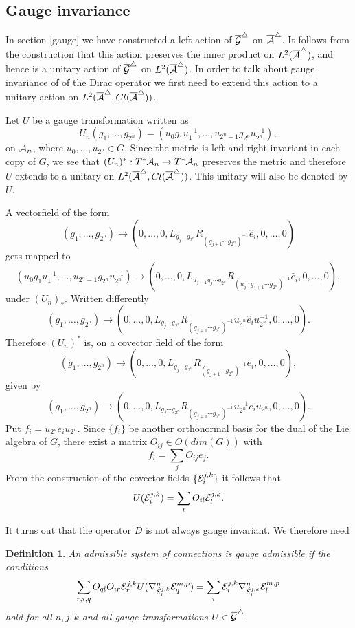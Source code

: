 \documentclass[12pt]{article}
\def\ca{{\cal A}}
\def\ce{{\cal E}}
\def\cf{{\cal F}}
\def\cg{{\cal G}}
\newtheorem{definition}[thm]{Definition}
\begin{document}
{\subsection{Gauge invariance}
In section \ref{gauge} we have constructed a left action of $\overline{\cg}^\triangle$ on $\overline{\ca}^\triangle$. It follows from the construction that this action preserves the inner product on $L^2(\overline{\ca}^\triangle)$, and hence is a unitary action of $\overline{\cg}^\triangle$ on $L^2(\overline{\ca}^\triangle)$. In order to talk about gauge invariance of of the Dirac operator we first need to extend this action to a unitary action on $L^2(\overline{\ca}^\triangle, Cl(\overline{\ca}^\triangle))$. 

Let $U$ be a gauge transformation written as 
$$U_n (g_1,\ldots, g_{2^n})=(u_0g_1u_1^{-1},\ldots , u_{2^n-1}g_{2^n}u_{2^n}^{-1}),$$
on $\ca_n$, where $u_0,\ldots , u_{2^n}\in G$. Since the metric is left and right invariant in each copy of $G$, we see that $(U_n)^*:T^*\ca_n\to T^*\ca_n$ preserves the metric and therefore $U$ extends to a unitary on $L^2(\overline{\ca}^\triangle, Cl(\overline{\ca}^\triangle))$. This unitary will also be denoted by $U$. 

A vectorfield of the form 
$$(g_1,\ldots, g_{2^n})\to (0,\ldots,0,L_{g_j\cdots g_{2^n}}R_{(g_{j+1}\cdots g_{2^n})^{-1}}\hat{e}_i,0 , \ldots,0)$$
gets mapped to
$$  (u_0g_1u_1^{-1},\ldots , u_{2^n-1}g_{2^n}u_{2^n}^{-1}) \to (0,\ldots,0,L_{u_{j-1}g_j\cdots g_{2^n}}R_{(u_{j}^{-1}g_{j+1}\cdots g_{2^n})^{-1}}\hat{e}_i,0 , \ldots,0),$$
under $(U_n)_*$. Written differently
$$(g_1,\ldots, g_{2^n})\to (0,\ldots,0,L_{g_j\cdots g_{2^n}}R_{(g_{j+1}\cdots g_{2^n})^{-1}}u_{2^n}\hat{e}_iu_{2^n}^{-1},0 , \ldots,0).$$
Therefore $(U_n)^*$ is, on a covector field of the form 
$$(g_1,\ldots, g_{2^n})\to (0,\ldots,0,L_{g_j\cdots g_{2^n}}R_{(g_{j+1}\cdots g_{2^n})^{-1}} e_i,0 , \ldots,0),$$
given by
$$(g_1,\ldots, g_{2^n})\to (0,\ldots,0,L_{g_j\cdots g_{2^n}}R_{(g_{j+1}\cdots g_{2^n})^{-1}}u_{2^n}^{-1}e_iu_{2^n},0 , \ldots,0).$$
Put $f_i=u_{2^n}e_iu_{2^n}$. Since $\{f_i\}$ be another orthonormal basis for the dual of the Lie algebra of $G$, there exist a matrix $O_{ij} \in O(dim(G))$ with 
$$f_i=\sum_j O_{ij}e_j.$$ 
 From the construction of the covector fields  $\{\ce_i^{j,k}\}$ it follows that 
$$U(\ce_i^{j,k})=\sum_l O_{il}\ce_l^{j,k}.$$



It turns out that the operator $D$ is not always gauge invariant. We therefore need
\begin{definition}
 An admissible system of connections is gauge admissible if the conditions 
$$\sum_{r,i,q} O_{ql} O_{ir}\ce_r^{j,k}U( \nabla^n_{\hat{\ce}_i^{j,k}} \ce_q^{m,p})=\sum_i\ce_i^{j,k}\nabla^n_{\hat{\ce}_i^{j,k}}\ce_l^{m,p}$$
hold for all $n,j,k$ and all gauge transformations $U\in \overline{\cg}^\triangle$.
\end{definition}

}
\end{document}
